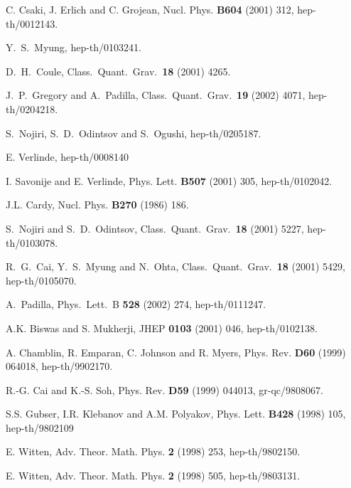 \documentclass[a4paper,11pt]{article}
\begin{document}
\begin{thebibliography}{99}
 C. Csaki, J. Erlich and C. Grojean, Nucl. Phys. {\bf B604} 
(2001) 312, hep-th/0012143.

Y.~S.~Myung, hep-th/0103241.

D.~H.~Coule,
Class.\ Quant.\ Grav.\  {\bf 18} (2001) 4265.

J.~P.~Gregory and A.~Padilla,
Class.\ Quant.\ Grav.\  {\bf 19} (2002) 4071,
hep-th/0204218.

S.~Nojiri, S.~D.~Odintsov and S.~Ogushi, hep-th/0205187.

 E. Verlinde, hep-th/0008140

 I. Savonije and E. Verlinde, Phys. Lett. {\bf B507} (2001) 
305, hep-th/0102042.

J.L. Cardy, Nucl. Phys. {\bf B270} (1986) 186.

S.~Nojiri and S.~D.~Odintsov, Class.\ Quant.\ Grav.\  {\bf 18} (2001) 5227,
hep-th/0103078.

R.~G.~Cai, Y.~S.~Myung and N.~Ohta, Class.\ Quant.\ Grav.\  {\bf 18} (2001) 5429, hep-th/0105070.

A.~Padilla, Phys.\ Lett.\ B {\bf 528} (2002) 274, hep-th/0111247.

 A.K. Biswas and S. Mukherji, JHEP {\bf 0103} (2001) 046, 
hep-th/0102138.

 A. Chamblin, R. Emparan, C. Johnson and R. Myers, Phys. 
Rev. {\bf D60} (1999) 064018, hep-th/9902170.

R.-G. Cai and K.-S. Soh, Phys. Rev. {\bf D59} (1999) 044013, 
gr-qc/9808067.

S.S. Gubser, I.R. Klebanov and A.M. Polyakov, Phys. Lett.
{\bf B428} (1998) 105, hep-th/9802109

 E. Witten, Adv. Theor. Math. Phys. {\bf 2} (1998) 253, 
hep-th/9802150.

 E. Witten, Adv. Theor. Math. Phys. {\bf 2} (1998) 505,
hep-th/9803131.


\end{thebibliography}
\end{document}
